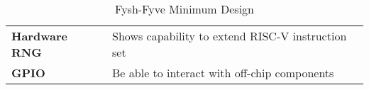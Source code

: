 \newcommand{\ch}[2]{%
	\textbf{#1} & #2 \\%
	\hline%
}
\begin{table}[H]
	\begin{tabularx}{\textwidth}{| a | x |}
		\hline
		 &  \\
		\hline
		\ch{Hardware RNG}{Shows capability to extend RISC-V instruction set}
		\ch{GPIO}{Be able to interact with off-chip components}
	\end{tabularx}
	\label{Tab:chyp}
	\caption{Fysh-Fyve Minimum Design}
\end{table}

